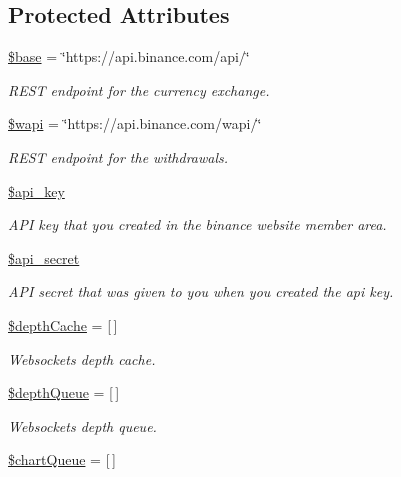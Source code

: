\subsection*{Protected Attributes}
\begin{DoxyCompactItemize}
\item 
\hyperlink{classBinance_1_1API_ac863e52396757997d84e6783b5336828}{\$base} = \char`\"{}https\-://api.\-binance.\-com/api/\char`\"{}
\begin{DoxyCompactList}\small\item\em R\-E\-S\-T endpoint for the currency exchange. \end{DoxyCompactList}\item 
\hyperlink{classBinance_1_1API_a52a5376574ff759fb1df6c8efe24cb7f}{\$wapi} = \char`\"{}https\-://api.\-binance.\-com/wapi/\char`\"{}
\begin{DoxyCompactList}\small\item\em R\-E\-S\-T endpoint for the withdrawals. \end{DoxyCompactList}\item 
\hyperlink{classBinance_1_1API_a4b70fc1796d52440e44423da2cbafca5}{\$api\-\_\-key}
\begin{DoxyCompactList}\small\item\em A\-P\-I key that you created in the binance website member area. \end{DoxyCompactList}\item 
\hyperlink{classBinance_1_1API_a5612f3068ec5843031812893537e7677}{\$api\-\_\-secret}
\begin{DoxyCompactList}\small\item\em A\-P\-I secret that was given to you when you created the api key. \end{DoxyCompactList}\item 
\hyperlink{classBinance_1_1API_a69d62e886266a59b0a314cb4f5f164ca}{\$depth\-Cache} = \mbox{[}$\,$\mbox{]}
\begin{DoxyCompactList}\small\item\em Websockets depth cache. \end{DoxyCompactList}\item 
\hyperlink{classBinance_1_1API_ab04600479e07a4af0ead9ba84772bde1}{\$depth\-Queue} = \mbox{[}$\,$\mbox{]}
\begin{DoxyCompactList}\small\item\em Websockets depth queue. \end{DoxyCompactList}\item 
\hyperlink{classBinance_1_1API_aaa75d873054290eecf1dd2876237a279}{\$chart\-Queue} = \mbox{[}$\,$\mbox{]}

\end{DoxyCompactItemize}
